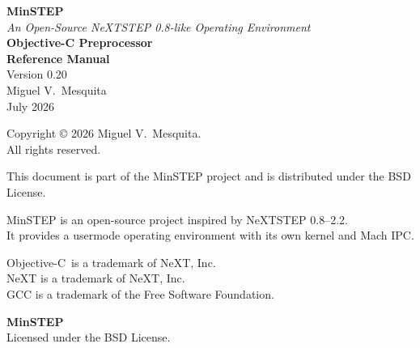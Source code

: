 \documentclass[11pt,twoside]{article}
\newcommand{\ObjC}{Objective-C}
\begin{document}

\thispagestyle{empty}
\begin{center}
\vspace*{2in}

{\LARGE\bfseries MinSTEP}\\[0.3in]
{\large\itshape An Open-Source NeXTSTEP 0.8-like Operating Environment}\\[0.5in]
{\LARGE\bfseries Objective-C Preprocessor}\\[0.3in]
{\Large\bfseries Reference Manual}\\[0.8in]
{\large Version 0.20}\\[0.5in]
\vfill
{\large Miguel V.\ Mesquita}\\[0.2in]
{\large July 2026}

\end{center}

\newpage


\thispagestyle{empty}
\vspace*{8in}

\begin{center}
\small
Copyright {\copyright} 2026 Miguel V.\ Mesquita.\\
All rights reserved.

\medskip

This document is part of the MinSTEP project and is distributed
under the BSD License.

\medskip

MinSTEP is an open-source project inspired by NeXTSTEP 0.8--2.2.\\
It provides a usermode operating environment with its own kernel
and Mach IPC.

\medskip

\ObjC\ is a trademark of NeXT, Inc.\\
NeXT is a trademark of NeXT, Inc.\\
GCC is a trademark of the Free Software Foundation.

\bigskip

{\bf MinSTEP}\\
Licensed under the BSD License.
\end{center}
\end{document}
